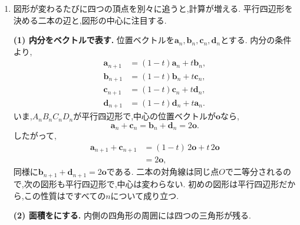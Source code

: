 \begin{enumerate}[label=\textbf{問\arabic*.},leftmargin=3.8em,format=\bookitemlink{practice-entrance}{solution}{problem}]
\[                    c_kc_{n-k}=\frac1{4^n}\binom{2k}{k}
                                              \binom{2n-2k}{n-k}.
                  \]
                  $T_n=1$を$4^n$倍すれば設問の恒等式となる.
                  例えば$n=2$では$1\cdot6+2\cdot2+6\cdot1=16$である.
                  複雑な各項でも,和を一つのとして追うと簡単な性質が現れる.
          \item 図形が変わるたびに四つの頂点を別々に追うと,計算が増える.
                平行四辺形を決める二本の辺と,図形の中心に注目する.
                \par\noindent
                \textbf{(1) 内分をベクトルで表す.}
                位置ベクトルを$\boldsymbol a_n,\boldsymbol b_n,
                \boldsymbol c_n,\boldsymbol d_n$とする.
                内分の条件より,
                \[
                 \begin{aligned}
                 \boldsymbol a_{n+1}&=(1-t)\boldsymbol a_n+t\boldsymbol b_n,\\
                 \boldsymbol b_{n+1}&=(1-t)\boldsymbol b_n+t\boldsymbol c_n,\\
                 \boldsymbol c_{n+1}&=(1-t)\boldsymbol c_n+t\boldsymbol d_n,\\
                 \boldsymbol d_{n+1}&=(1-t)\boldsymbol d_n+t\boldsymbol a_n.
                 \end{aligned}
                \]
                いま,$A_nB_nC_nD_n$が平行四辺形で,中心の位置ベクトルが$\boldsymbol o$なら,
                \[
                 \boldsymbol a_n+\boldsymbol c_n
                 =\boldsymbol b_n+\boldsymbol d_n=2\boldsymbol o.
                \]
                したがって,
                \[
                 \begin{aligned}
                 \boldsymbol a_{n+1}+\boldsymbol c_{n+1}
                  &=(1-t)\,2\boldsymbol o+t\,2\boldsymbol o\\
                  &=2\boldsymbol o,
                 \end{aligned}
                \]
                同様に$\boldsymbol b_{n+1}+\boldsymbol d_{n+1}=2\boldsymbol o$である.
                二本の対角線は同じ点$O$で二等分されるので,次の図形も平行四辺形で,中心は変わらない.
                初めの図形は平行四辺形だから,この性質はですべての$n$について成り立つ.
                \par\noindent
                \textbf{(2) 面積をにする.}
                内側の四角形の周囲には四つの三角形が残る.

\end{enumerate}
